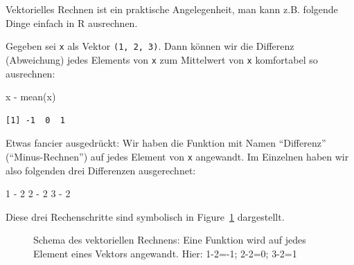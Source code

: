 \documentclass[
  letterpaper,
  DIV=11,
  numbers=noendperiod]{scrartcl}
\newenvironment{Shaded}{\begin{snugshade}}{\end{snugshade}}
\newcommand{\DecValTok}[1]{\textcolor[rgb]{0.68,0.00,0.00}{#1}}
\newcommand{\FunctionTok}[1]{\textcolor[rgb]{0.28,0.35,0.67}{#1}}
\newcommand{\NormalTok}[1]{\textcolor[rgb]{0.00,0.23,0.31}{#1}}
\newcommand{\SpecialCharTok}[1]{\textcolor[rgb]{0.37,0.37,0.37}{#1}}
\theoremstyle{definition}
\theoremstyle{definition}
\theoremstyle{definition}
\theoremstyle{remark}
\begin{document}
Vektorielles Rechnen ist ein praktische Angelegenheit, man kann z.B.
folgende Dinge einfach in R ausrechnen.

Gegeben sei \texttt{x} als Vektor \texttt{(1,\ 2,\ 3)}. Dann können wir
die Differenz (Abweichung) jedes Elements von \texttt{x} zum Mittelwert
von \texttt{x} komfortabel so ausrechnen:

\begin{Shaded}
\begin{Highlighting}[]
\NormalTok{x }\SpecialCharTok{{-}} \FunctionTok{mean}\NormalTok{(x)}
\end{Highlighting}
\end{Shaded}

\begin{verbatim}
[1] -1  0  1
\end{verbatim}

Etwas fancier ausgedrückt: Wir haben die Funktion mit Namen
``Differenz'' (``Minus-Rechnen'') auf jedes Element von \texttt{x}
angewandt. Im Einzelnen haben wir also folgenden drei Differenzen
ausgerechnet:

\begin{Shaded}
\begin{Highlighting}[]
\DecValTok{1} \SpecialCharTok{{-}} \DecValTok{2}
\DecValTok{2} \SpecialCharTok{{-}} \DecValTok{2}
\DecValTok{3} \SpecialCharTok{{-}} \DecValTok{2}
\end{Highlighting}
\end{Shaded}

Diese drei Rechenschritte sind symbolisch in Figure~\ref{fig-vektoriell}
dargestellt.

\begin{figure}


\caption{\label{fig-vektoriell}Schema des vektoriellen Rechnens: Eine
Funktion wird auf jedes Element eines Vektors angewandt. Hier: 1-2=-1;
2-2=0; 3-2=1}

\end{figure}%
\end{document}
